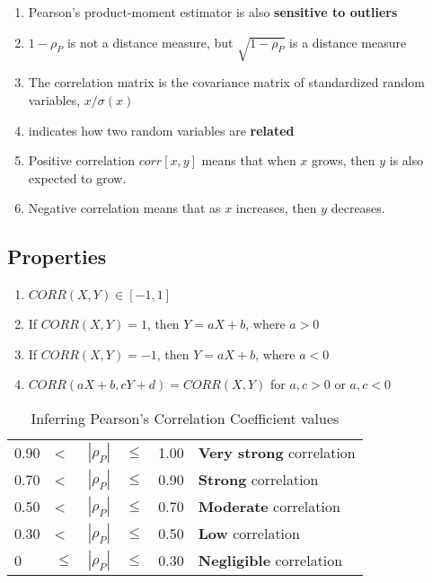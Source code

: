 \begin{enumerate}
    \item Pearson’s product-moment estimator is also \textbf{sensitive to outliers}

    \item $1-\rho_P$ is not a distance measure, but $\sqrt{1-\rho_P}$ is a distance measure

    \item The correlation matrix is the covariance matrix of standardized random variables, $x/\sigma(x)$

    \item indicates how two random variables are \textbf{related}

    \item Positive correlation $corr[x, y]$ means that when $x$ grows, then $y$ is also expected to grow. 

    \item Negative correlation means that as $x$ increases, then $y$ decreases.

\end{enumerate}

\subsection*{Properties \cite{ism-1}}

\begin{enumerate}
    \item $CORR(X, Y) \in [-1, 1]$

    \item If $CORR(X, Y) = 1$, then $Y = aX + b$, where $a > 0$

    \item If $CORR(X, Y) = -1$, then $Y = aX + b$, where $a < 0$

    \item $CORR(aX + b, cY + d) = CORR(X, Y)$  for $a, c > 0$ or $a, c < 0$

    
\end{enumerate}

\begin{table}[H]
    \centering
    \begin{tabular}{l l l l l l} 
        0.90 & < & $|\rho_P|$ & $\leq$ & 1.00 & \textbf{Very strong} correlation\\
        0.70 & < & $|\rho_P|$ & $\leq$ & 0.90  & \textbf{Strong} correlation\\
        0.50 & < & $|\rho_P|$ & $\leq$ & 0.70 &  \textbf{Moderate} correlation\\
        0.30 & < & $|\rho_P|$ & $\leq$ & 0.50  & \textbf{Low} correlation\\
        0  &  $\leq$ & $|\rho_P|$ & $\leq$ & 0.30 &  \textbf{Negligible} correlation\\
    \end{tabular}
    \caption{Inferring Pearson’s Correlation Coefficient values \cite{ism-1}}
\end{table}


